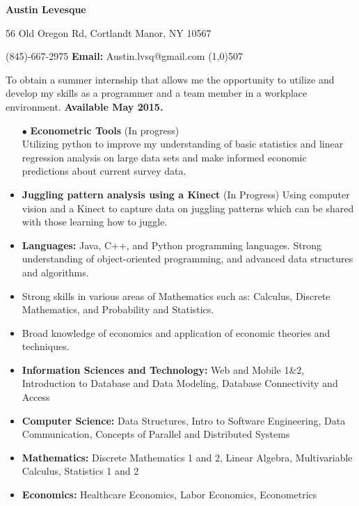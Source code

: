 \documentclass[11pt]{article}
\begin{document}
\centerline{\Large \bf Austin Levesque}
\vspace{.5ex}
\centerline{56 Old Oregon Rd, Cortlandt Manor, NY 10567}
\vspace{1ex}
 (845)-667-2975 \hfill {\bf Email:} Austin.lvsq@gmail.com
\line(1,0){507}
\vspace{2ex}

To obtain a summer internship that allows me the opportunity to utilize and develop my skills as a programmer and a team member in a workplace environment. {\bf Available May 2015.}
\vspace{1ex}

\begin{itemize}[topsep=.3ex, itemsep=0ex, partopsep=0ex, parsep=1ex]
	\item[$\bullet$] {\bf Econometric Tools} (In progress)\\
	Utilizing python to improve my understanding of basic statistics and linear regression analysis on large data sets and make informed economic predictions about current survey data.
	\item {\bf Juggling pattern analysis using a Kinect} (In Progress)
	Using computer vision and a Kinect to capture data on juggling patterns which can be shared with those learning how to juggle.
\end{itemize}
\vspace{1ex}
\begin{itemize} [topsep=.3ex, itemsep=0ex, partopsep=0ex, parsep=1ex]
	\item {\bf Languages:} Java, C++, and Python programming languages. Strong understanding of object-oriented programming, and advanced data structures and algorithms.
 	\item Strong skills in various areas of Mathematics such as: Calculus, Discrete Mathematics, and Probability and Statistics.
	\item Broad knowledge of economics and application of economic theories and techniques.
\end{itemize}
\vspace{1ex}
\begin{itemize}[topsep=0.3ex, itemsep=0ex, partopsep=0ex, parsep=0ex]
	\item {\bf Information Sciences and Technology:} Web and Mobile 1\&2, Introduction to Database and Data Modeling, Database Connectivity and Access
	\item {\bf Computer Science:} Data Structures, Intro to Software Engineering, Data Communication, Concepts of Parallel and Distributed Systems
	\item {\bf Mathematics:} Discrete Mathematics 1 and 2, Linear Algebra, Multivariable Calculus, Statistics 1 and 2
	\item {\bf Economics:} Healthcare Economics, Labor Economics, Econometrics
\end{itemize}
\end{document}
